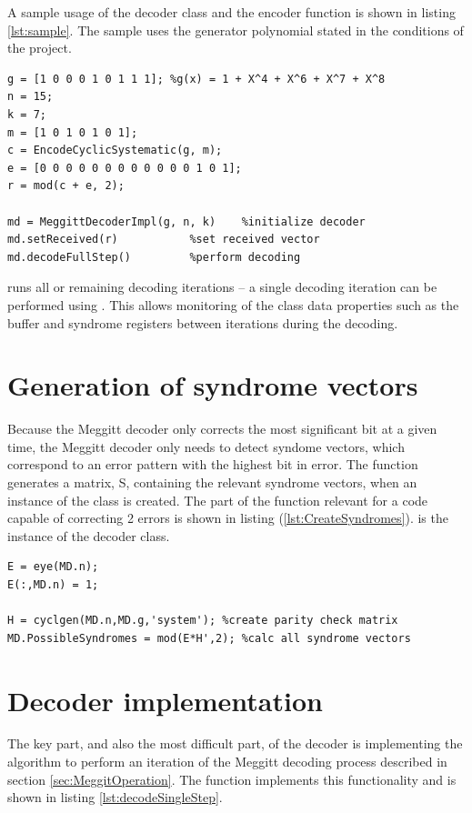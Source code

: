 \documentclass[Main]{subfiles}
\begin{document}
A sample usage of the decoder class and the encoder function is shown in listing \ref{lst:sample}. The sample uses the generator polynomial stated in the conditions of the project.


\begin{lstlisting}[label={lst:sample},captionpos=b, caption=Sample usage of the decoder.] 
%setup
g = [1 0 0 0 1 0 1 1 1]; %g(x) = 1 + X^4 + X^6 + X^7 + X^8
n = 15;
k = 7;
m = [1 0 1 0 1 0 1];
c = EncodeCyclicSystematic(g, m);
e = [0 0 0 0 0 0 0 0 0 0 0 0 1 0 1];
r = mod(c + e, 2);

md = MeggittDecoderImpl(g, n, k)	%initialize decoder
md.setReceived(r)			%set received vector
md.decodeFullStep()			%perform decoding
\end{lstlisting}

 runs all or remaining decoding iterations -- a single decoding iteration can be performed using . This allows monitoring of the class data properties such as the buffer and syndrome registers between iterations during the decoding.

\section{Generation of syndrome vectors}
Because the Meggitt decoder only corrects the most significant bit at a given time, the Meggitt decoder only needs to detect syndome vectors, which correspond to an error pattern with the highest bit in error. The function  generates a matrix, S, containing the relevant syndrome vectors, when an instance of the  class is created. The part of the function relevant for a code capable of correcting 2 errors is shown in listing (\ref{lst:CreateSyndromes}).  is the instance of the decoder class.

\begin{lstlisting}[label={lst:CreateSyndromes},captionpos=b, caption=Creating possible syndrome vectors.] 
%create 2 bit error patterns with highest bit in error
E = eye(MD.n);
E(:,MD.n) = 1;

H = cyclgen(MD.n,MD.g,'system'); %create parity check matrix
MD.PossibleSyndromes = mod(E*H',2); %calc all syndrome vectors
\end{lstlisting}

\section{Decoder implementation}
The key part, and also the most difficult part, of the decoder is implementing the algorithm to perform an iteration of the Meggitt decoding process described in section \ref{sec:MeggitOperation}. The function  implements this functionality and is shown in listing \ref{lst:decodeSingleStep}.
\end{document}
